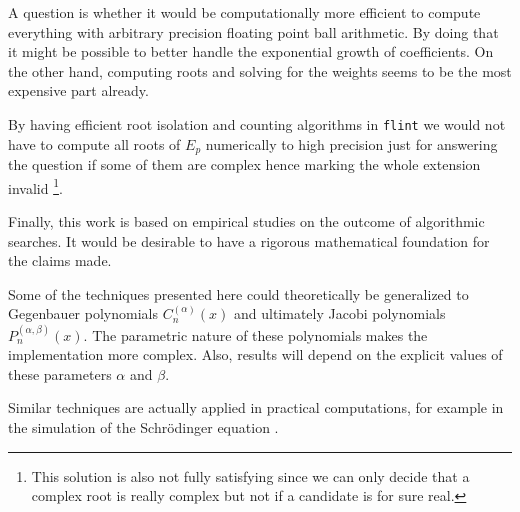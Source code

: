 \documentclass[a4paper,10pt]{article}
\begin{document}
A question is whether it would be computationally more efficient to compute
everything with arbitrary precision floating point ball arithmetic. By doing that
it might be possible to better handle the exponential growth of coefficients.
On the other hand, computing roots and solving for the weights seems to be
the most expensive part already.

By having efficient root isolation and counting algorithms in \texttt{flint} we would
not have to compute all roots of $E_p$ numerically to high precision just for answering
the question if some of them are complex hence marking the whole extension invalid
\footnote{This solution is also not fully satisfying since we can only
decide that a complex root is really complex but not if a candidate is for sure real.}.

Finally, this work is based on empirical studies on the outcome of algorithmic searches.
It would be desirable to have a rigorous mathematical foundation for the claims made.

Some of the techniques presented here could theoretically be generalized to Gegenbauer
polynomials $C_n^{(\alpha)}(x)$ and ultimately Jacobi polynomials $P_n^{(\alpha,\beta)}(x)$.
The parametric nature of these polynomials makes the implementation more complex. Also,
results will depend on the explicit values of these parameters $\alpha$ and $\beta$.

Similar techniques are actually applied in practical computations, for example
in the simulation of the Schr\"odinger equation \cite{tucker}.
\end{document}
